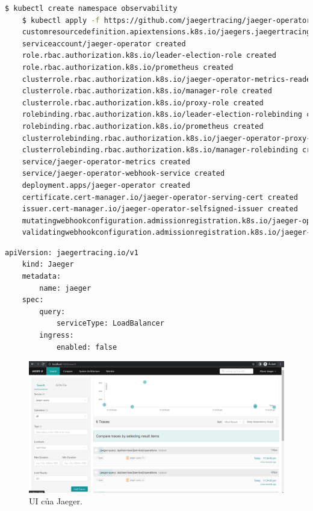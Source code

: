 \documentclass[12pt,a4paper]{report}
\begin{document}
	\begin{lstlisting}[language=Bash]
	$ kubectl create namespace observability
	$ kubectl apply -f https://github.com/jaegertracing/jaeger-operator/releases/download/v1.40.0/jaeger-operator.yaml
	customresourcedefinition.apiextensions.k8s.io/jaegers.jaegertracing.io created
	serviceaccount/jaeger-operator created
	role.rbac.authorization.k8s.io/leader-election-role created
	role.rbac.authorization.k8s.io/prometheus created
	clusterrole.rbac.authorization.k8s.io/jaeger-operator-metrics-reader created
	clusterrole.rbac.authorization.k8s.io/manager-role created
	clusterrole.rbac.authorization.k8s.io/proxy-role created
	rolebinding.rbac.authorization.k8s.io/leader-election-rolebinding created
	rolebinding.rbac.authorization.k8s.io/prometheus created
	clusterrolebinding.rbac.authorization.k8s.io/jaeger-operator-proxy-rolebinding created
	clusterrolebinding.rbac.authorization.k8s.io/manager-rolebinding created
	service/jaeger-operator-metrics created
	service/jaeger-operator-webhook-service created
	deployment.apps/jaeger-operator created
	certificate.cert-manager.io/jaeger-operator-serving-cert created
	issuer.cert-manager.io/jaeger-operator-selfsigned-issuer created
	mutatingwebhookconfiguration.admissionregistration.k8s.io/jaeger-operator-mutating-webhook-configuration created
	validatingwebhookconfiguration.admissionregistration.k8s.io/jaeger-operator-validating-webhook-configuration created
	\end{lstlisting}
	\hspace{1.0cm}{Tiếp theo, chúng ta sẽ tạo 1 tệp tin để tạo 1 ứng dụng Jaeger, pod loại Jaeger, ứng dụng này sẽ thu thập dữ liệu được gửi lên từ ứng dụng frontend và backend. Nội dung của tệp tin như sau:}
	\begin{lstlisting}[language=Bash]
	apiVersion: jaegertracing.io/v1
	kind: Jaeger
	metadata:
		name: jaeger
	spec:
		query:
			serviceType: LoadBalancer
		ingress:
			enabled: false
	\end{lstlisting}
	\begin{figure}[h]
		\centering
		\includegraphics[width=1\linewidth]{Pics/jaeger-ui}
		\caption{\label{fig:jaeger-ui} UI của Jaeger.}
		\label{fig:jaeger-ui}
	\end{figure}
\end{document}
